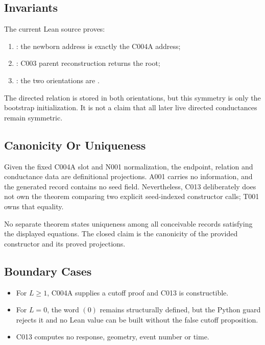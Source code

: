 \subsection{Invariants}\label{invariants-3}

The current Lean source proves:

\begin{enumerate}
\def\labelenumi{\arabic{enumi}.}
\tightlist
\item
  \texttt{\protect{}}: the newborn address is exactly the
  C004A address;
\item
  \texttt{\protect{}}: C003 parent reconstruction returns the
  root;
\item
  \texttt{\protect{}}: the two orientations
  are \texttt{\protect{}}.
\end{enumerate}

The directed relation is stored in both orientations, but this symmetry
is only the bootstrap initialization. It is not a claim that all later
live directed conductances remain symmetric.

\subsection{Canonicity Or Uniqueness}\label{canonicity-or-uniqueness-3}

Given the fixed C004A slot and N001 normalization, the endpoint,
relation and conductance data are definitional projections. A001 carries
no information, and the generated record contains no seed field.
Nevertheless, C013 deliberately does not own the theorem comparing two
explicit seed-indexed constructor calls; T001 owns that equality.

No separate theorem states uniqueness among all conceivable records
satisfying the displayed equations. The closed claim is the canonicity
of the provided constructor and its proved projections.

\subsection{Boundary Cases}\label{boundary-cases-3}

\begin{itemize}
\tightlist
\item
  For \(L\ge1\), C004A supplies a cutoff proof and C013 is
  constructible.
\item
  For \(L=0\), the word \((0)\) remains structurally defined, but the
  Python guard rejects it and no Lean value can be built without the
  false cutoff proposition.
\item
  C013 computes no response, geometry, event number or time.
\end{itemize}

